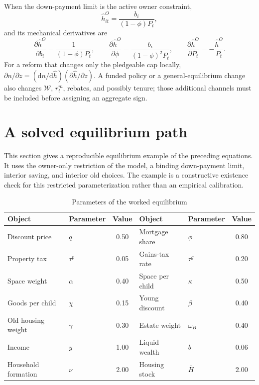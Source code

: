 \documentclass[11pt]{article}
\theoremstyle{definition}
\theoremstyle{remark}
\newcommand{\dd}{\mathrm d}
\begin{document}
When the down-payment limit is the active owner constraint,
\begin{equation}
 \widehat h_{it}^O=\frac{b_i}{(1-\phi)P_t},
 \label{eq:finance_cap_app}
\end{equation}
and its mechanical derivatives are
\begin{equation}
 \frac{\partial\widehat h^O}{\partial b_i}
 =\frac1{(1-\phi)P_t},\qquad
 \frac{\partial\widehat h^O}{\partial\phi}
 =\frac{b_i}{(1-\phi)^2P_t},\qquad
 \frac{\partial\widehat h^O}{\partial P_t}
 =-\frac{\widehat h^O}{P_t}.
 \label{eq:cap_pass_through}
\end{equation}
For a reform that changes only the pledgeable cap locally,
$\partial n/\partial z=(\dd n/\dd\widehat h)
(\partial\widehat h/\partial z)$.  A funded policy or a general-equilibrium
change also changes $\mathcal W$, $r_t^m$, rebates, and possibly tenure; those
additional channels must be included before assigning an aggregate sign.

\section{A solved equilibrium path}

This section gives a reproducible equilibrium example of the preceding
equations.  It uses the owner-only restriction of the model, a binding
down-payment limit, interior saving, and interior old choices.  The example is
a constructive existence check for this restricted parameterization rather
than an empirical calibration.

\begin{table}[ht]
\centering
\caption{Parameters of the worked equilibrium}
\label{tab:worked_parameters}
\small
\begin{tabular}{@{}llcllc@{}}
\toprule
Object & Parameter & Value & Object & Parameter & Value\\
\midrule
Discount price & $q$ & 0.50 & Mortgage share & $\phi$ & 0.80\\
Property tax & $\tau^p$ & 0.05 & Gains-tax rate & $\tau^g$ & 0.20\\
Space weight & $\alpha$ & 0.40 & Space per child & $\kappa$ & 0.50\\
Goods per child & $\chi$ & 0.15 & Young discount & $\beta$ & 0.40\\
Old housing weight & $\gamma$ & 0.30 & Estate weight & $\omega_B$ & 0.40\\
Income & $y$ & 1.00 & Liquid wealth & $b$ & 0.06\\
Household formation & $\nu$ & 2.00 & Housing stock & $\bar H$ & 2.00\\
\bottomrule
\end{tabular}
\end{table}
\end{document}
